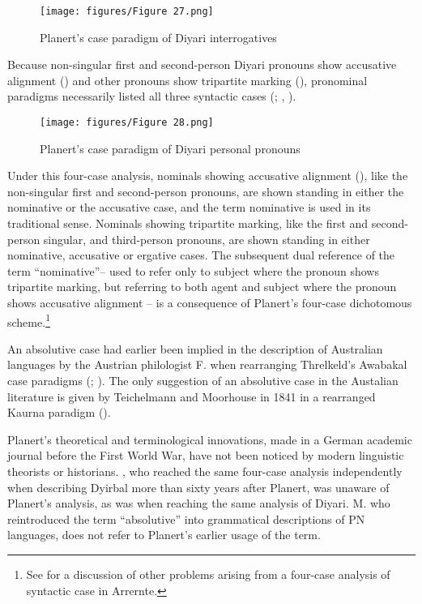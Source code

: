 \begin{figure}
\texttt{[image: figures/Figure 27.png]}
\caption{Planert’s case paradigm of Diyari interrogatives \citep[689]{planert_australische_1908}}
\label{fig:2:27}
\end{figure} 

\hspace*{-3.8pt}Because non-singular first and second-person Diyari pronouns show accusative alignment () and other pronouns show tripartite marking (), pronominal paradigms necessarily listed all three syntactic cases (\citealt[689]{planert_australische_1908}; \citealt[52]{austin_grammar_2013}, ).

\begin{figure}
\texttt{[image: figures/Figure 28.png]}
\caption{Planert's case paradigm of Diyari personal pronouns \citep[689]{planert_australische_1908}}
\label{fig:2:28}
\end{figure}

Under this four-case analysis, nominals showing accusative alignment (), like the non-singular first and second-person pronouns, are shown standing in either the nominative or the accusative case, and the term nominative is used in its traditional sense. Nominals showing tripartite marking, like the first and second-person singular, and third-person pronouns, are shown standing in either nominative, accusative or ergative cases. The subsequent dual reference of the term “nominative”– used to refer only to subject where the pronoun shows tripartite marking, but referring to both agent and subject where the pronoun shows accusative alignment – is a consequence of Planert’s four-case dichotomous scheme.\footnote{See \citet[163--166]{wilkins_mparntwe_1989} for a discussion of other problems arising from a four-case analysis of syntactic case in Arrernte.} 

An absolutive case had earlier been implied in the description of Australian languages by the Austrian philologist F. \citet[19]{muller_grundris_1882} when rearranging Threlkeld’s Awabakal case paradigms (\citeyear[13--16]{threlkeld_australian_1834}; ). The only suggestion of an absolutive case in the Austalian literature is given by Teichelmann and Moorhouse in 1841 in a rearranged Kaurna paradigm ().

Planert’s theoretical and terminological innovations, made in a German academic journal before the First World War, have not been noticed by modern linguistic theorists or historians. \citet[9]{dixon_dyirbal_1972}, who reached the same four-case analysis independently when describing Dyirbal more than sixty years after Planert, was unaware of Planert’s analysis, as was \citet{austin_grammar_2013} when reaching the same analysis of Diyari. M. \citet[112]{silverstein_hierarchy_1976} who reintroduced the term “absolutive” into grammatical descriptions of PN languages, does not refer to Planert’s earlier usage of the term.
